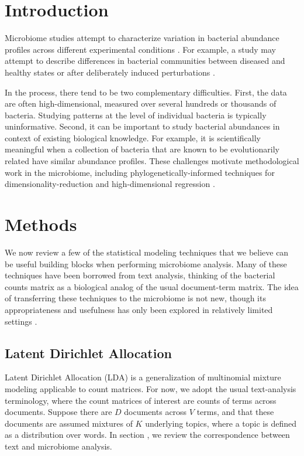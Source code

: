 \documentclass[oupdraft]{bio}
\begin{document}
\section{Introduction}

Microbiome studies attempt to characterize variation in bacterial abundance
profiles across different experimental conditions \citep{human2012structure}.
For example, a study may attempt to describe differences in bacterial
communities between diseased and healthy states or after deliberately induced
perturbations \citep{dethlefsen2011incomplete}.

In the process, there tend to be two complementary difficulties. First, the data
are often high-dimensional, measured over several hundreds or thousands of
bacteria. Studying patterns at the level of individual bacteria is typically
uninformative. Second, it can be important to study bacterial abundances in
context of existing biological knowledge. For example, it is scientifically
meaningful when a collection of bacteria that are known to be evolutionarily
related have similar abundance profiles. These challenges motivate
methodological work in the microbiome, including phylogenetically-informed
techniques for dimensionality-reduction \citep{fukuyama2017adaptive,
  chen2013structure} and high-dimensional regression
\citep{segata2011metagenomic, chen2013variable, shafiei2015biomico}.

\section{Methods}

We now review a few of the statistical modeling techniques that we believe can
be useful building blocks when performing microbiome analysis. Many of these
techniques have been borrowed from text analysis, thinking of the bacterial
counts matrix as a biological analog of the usual document-term matrix. The idea
of transferring these techniques to the microbiome is not new, though its
appropriateness and usefulness has only been explored in relatively limited
settings \citep{shafiei2015biomico, chen2012estimating, holmes2012dirichlet,
  chen2013variable}.

\subsection{Latent Dirichlet Allocation}

Latent Dirichlet Allocation (LDA) is a generalization of multinomial mixture
modeling applicable to count matrices. For now, we adopt the usual text-analysis
terminology, where the count matrices of interest are counts of terms across
documents. Suppose there are $D$ documents across $V$ terms, and that these
documents are assumed mixtures of $K$ underlying topics, where a topic is
defined as a distribution over words. In
section \label{sec:microbiome_vs_text_analysis}, we review the correspondence
between text and microbiome analysis.
\end{document}

